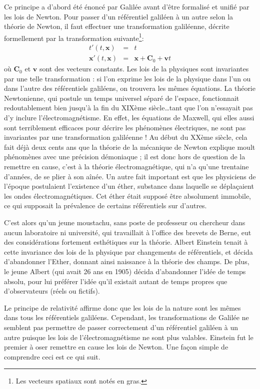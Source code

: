 		Ce principe a d'abord été énoncé par Galilée avant d'être formalisé et unifié par les lois de Newton. Pour passer d'un référentiel galiléen à un autre selon la théorie de Newton, il faut effectuer une transformation galiléenne, décrite formellement par la transformation suivante\footnote{Les vecteurs spatiaux sont notés en gras.}:
		\begin{eqnarray}
			t'(t,\bm{x})&=&t \\
			\bm{x}'(t,\bm{x})&=&\bm{x}+\bm{C}_0+\bm{v}t
		\end{eqnarray}
		où $\bm{C}_0$ et $\bm{v}$ sont des vecteurs constants. Les lois de la physiques sont invariantes par une telle transformation : si l'on exprime les lois de la physique dans l'un ou dans l'autre des référentiels galiléens, on trouvera les mêmes équations. La théorie Newtonienne, qui postule un temps universel séparé de l'espace, fonctionnait redoutablement bien jusqu'à la fin du XIXème siècle\ldots tant que l'on n'essayait pas d'y inclure l'électromagnétisme. En effet, les équations de Maxwell, qui elles aussi sont terriblement efficaces pour décrire les phénomènes électriques, ne sont pas invariantes par une transformation galiléenne ! Au début du XXème siècle, cela fait déjà deux cents ans que la théorie de la mécanique de Newton explique moult phénomènes avec une précision démoniaque ; il est donc hors de question de la remettre en cause, c'est à la théorie électromagnétique, qui n'a qu'une trentaine d'années, de se plier à son aînée. Un autre fait important est que les physiciens de l'époque postulaient l'existence d'un éther, substance dans laquelle se déplaçaient les ondes électromagnétiques. Cet éther était supposé être absolument immobile, ce qui supposait la prévalence de certains référentiels sur d'autres. 

		C'est alors qu'un jeune moustachu, sans poste de professeur ou chercheur dans aucun laboratoire ni université, qui travaillait à l'office des brevets de Berne, eut des considérations fortement esthétiques sur la théorie. Albert Einstein tenait à cette invariance des lois de la physique par changements de référentiels, et décida d'abandonner l'Ether, donnant ainsi naissance à la théorie des champs. De plus, le jeune Albert (qui avait 26 ans en 1905) décida d'abandonner l'idée de temps absolu, pour lui préférer l'idée qu'il existait autant de temps propres que d'observateurs (réels ou fictifs).

		Le principe de relativité affirme donc que les lois de la nature sont les mêmes dans tous les référentiels galiléens. Cependant, les transformations de Galilée ne semblent pas permettre de passer correctement d'un référentiel galiléen à un autre puisque les lois de l'électromagnétisme ne sont plus valables. Einstein fut le premier à oser remettre en cause les lois de Newton. Une façon simple de comprendre ceci est ce qui suit.

